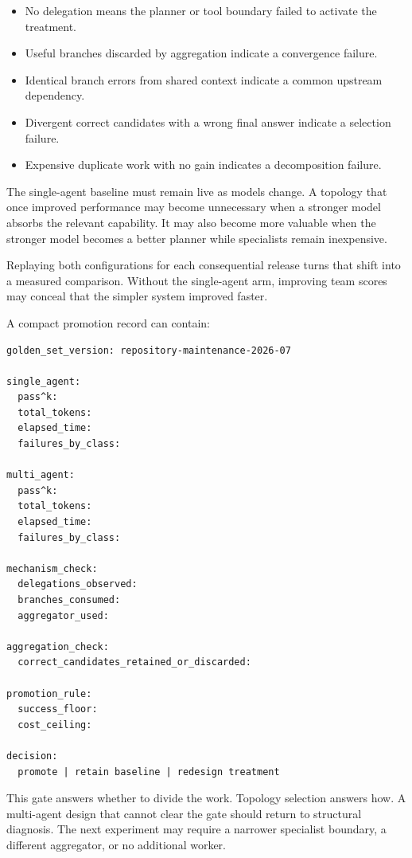\begin{itemize}
\tightlist
\item
  No delegation means the planner or tool boundary failed to activate the treatment.
\item
  Useful branches discarded by aggregation indicate a convergence failure.
\item
  Identical branch errors from shared context indicate a common upstream dependency.
\item
  Divergent correct candidates with a wrong final answer indicate a selection failure.
\item
  Expensive duplicate work with no gain indicates a decomposition failure.
\end{itemize}

The single-agent baseline must remain live as models change. A topology that once improved performance may become unnecessary when a stronger model absorbs the relevant capability. It may also become more valuable when the stronger model becomes a better planner while specialists remain inexpensive.

Replaying both configurations for each consequential release turns that shift into a measured comparison. Without the single-agent arm, improving team scores may conceal that the simpler system improved faster.

A compact promotion record can contain:

\begin{verbatim}
golden_set_version: repository-maintenance-2026-07

single_agent:
  pass^k:
  total_tokens:
  elapsed_time:
  failures_by_class:

multi_agent:
  pass^k:
  total_tokens:
  elapsed_time:
  failures_by_class:

mechanism_check:
  delegations_observed:
  branches_consumed:
  aggregator_used:

aggregation_check:
  correct_candidates_retained_or_discarded:

promotion_rule:
  success_floor:
  cost_ceiling:

decision:
  promote | retain baseline | redesign treatment
\end{verbatim}

This gate answers whether to divide the work. Topology selection answers how. A multi-agent design that cannot clear the gate should return to structural diagnosis. The next experiment may require a narrower specialist boundary, a different aggregator, or no additional worker.

